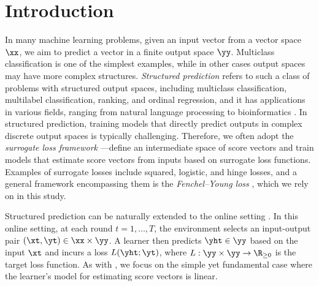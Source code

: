 \section{Introduction}
In many machine learning problems, given an input vector from a vector space $\xx$, we aim to predict a vector in a finite output space $\yy$.  
Multiclass classification is one of the simplest examples, while in other cases output spaces may have more complex structures. 
\emph{Structured prediction} refers to such a class of problems with structured output spaces, including multiclass classification, multilabel classification, ranking, and ordinal regression, and it has applications in various fields, ranging from natural language processing to bioinformatics \citep{JMLR_Tsochantaridis_2005, bakir_2007_article}.
In structured prediction, training models that directly predict outputs in complex discrete output spaces is typically challenging. 
Therefore, we often adopt the \emph{surrogate loss framework} \citep{Bartlett_2006}---define an intermediate space of score vectors and train models that estimate score vectors from inputs based on surrogate loss functions.
Examples of surrogate losses include squared, logistic, and hinge losses, and a general framework encompassing them is the \emph{Fenchel--Young loss} \citep{JMLR_2020_blondel}, which we rely on in this study.


Structured prediction can be naturally extended to the online setting \citep{pmlr-v247-sakaue24a}.  
In this online setting, at each round $t=1,\dots,T$, the environment selects an input-output pair $(\xt,\yt)\in\xx\times\yy$.  
A learner then predicts $\yht \in \yy$ based on the input $\xt$ and incurs a loss $L(\yht;\yt)$, where $L:\yy\times\yy\to\R_{\geq0}$ is the target loss function. 
As with \citet{pmlr-v247-sakaue24a}, we focus on the simple yet fundamental case where the learner's model for estimating score vectors is linear. 

